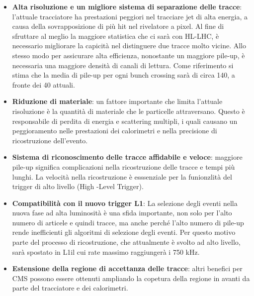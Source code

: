 \begin{itemize}
\item \textbf{Alta risoluzione e un migliore sistema di separazione delle tracce}: l'attuale tracciatore ha prestazioni peggiori nel tracciare jet di alta energia, a causa della sovrapposizione di più hit nel rivelatore a pixel. Al fine di sfruttare al meglio la maggiore statistica che ci sarà con HL-LHC, è necessario migliorare la capicità nel distinguere due tracce molto vicine. 
Allo stesso modo  per assicurare alta efficienza, nonostante un maggiore pile-up, è necessaria una maggiore densità di canali di lettura. Come riferimento si stima che la media di pile-up per ogni bunch crossing sarà di circa 140, a fronte dei 40 attuali.

\item \textbf{Riduzione di materiale}: un fattore importante che limita l'attuale risoluzione  è la quantità di materiale che le particelle attraversano. Questo è responsabile di perdita di energia e scattering multipli, i quali causano un peggioramento nelle prestazioni dei calorimetri e nella precisione di ricostruzione dell'evento.

\item \textbf{Sistema di riconoscimento delle tracce affidabile e veloce}: maggiore pile-up significa complicazioni nella ricostruzione delle tracce e tempi più lunghi. La velocità nella ricostruzione è esssenziale per la funionzlità del trigger di alto livello (High -Level Trigger). 

\item \textbf{Compatibilità con il nuovo trigger L1}: La selezione degli eventi nella nuova fase ad alta luminosità è una sfida importante, non solo per l'alto numero di articele e quindi tracce, ma anche perché l'alto numero di pile-up rende inefficienti gli algoritmi di selezione degli eventi. Per questo motivo parte del processo di ricostruzione, che attualmente è svolto ad alto livello, sarà spostato in L1il cui rate massimo raggiungerà i 750 kHz.

\item \textbf{Estensione della regione di accettanza delle tracce}: altri benefici per CMS possono essere ottenuti ampliando la copetura della regione in avanti da parte del tracciatore e dei calorimetri.

 
\end{itemize}


